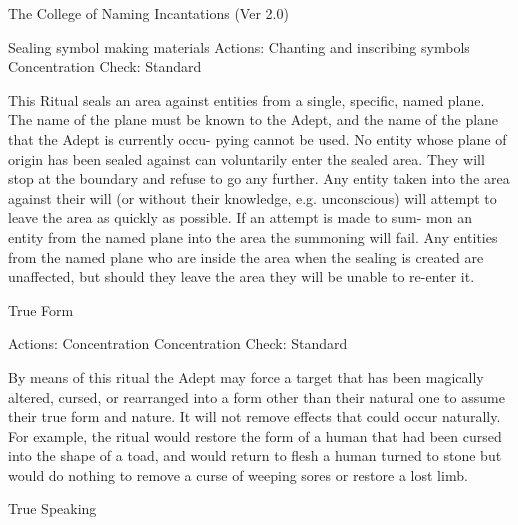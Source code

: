 \begin{Chapter}{The College of Naming Incantations (Ver 2.0)}
\begin{ritual}[R-5]{Sealing }
symbol making materials 
Actions: Chanting and inscribing symbols 
Concentration Check: Standard 
\begin{effects}
 This  Ritual  seals  an  area  against  entities 
from a single, specific, named plane. The name of 
the  plane  must  be  known  to  the  Adept,  and  the 
name of the plane that the Adept is currently occu-
pying  cannot  be  used.  No  entity  whose  plane  of 
origin has been sealed against can voluntarily enter 
the sealed area. They will stop at the boundary and 
refuse  to  go  any  further.  Any  entity  taken into  the 
area against their will (or without their knowledge, 
e.g.  unconscious)  will  attempt  to  leave  the  area  as 
quickly  as  possible.  If  an  attempt  is made  to  sum-
mon  an  entity  from  the  named  plane  into  the  area 
the  summoning  will  fail.  Any  entities  from  the 
named  plane  who  are  inside  the  area  when  the 
sealing  is  created  are  unaffected,  but  should  they 
leave the area they will be unable to re-enter it. 

\end{effects}
\end{ritual}

\begin{ritual}[R-6]{True Form }

Actions: Concentration 
Concentration Check: Standard 
\begin{effects}
 By  means  of  this  ritual  the  Adept  may 
force  a  target  that  has  been  magically  altered, 
cursed,  or  rearranged  into  a  form  other  than  their 
natural one to assume their true form and nature. It 
will  not  remove  effects  that  could  occur  naturally. 
For example, the ritual would restore the form of a 
human  that  had  been  cursed  into  the  shape  of  a 
toad,  and  would  return  to  flesh  a  human  turned  to 
stone  but  would  do  nothing  to  remove  a  curse  of 
weeping sores or restore a lost limb. 

\end{effects}
\end{ritual}

\begin{ritual}[R-7]{True Speaking }


\end{ritual}
\end{Chapter}
